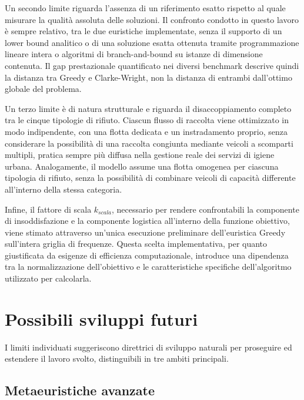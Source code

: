 Un secondo limite riguarda l'assenza di un riferimento esatto rispetto al quale misurare la qualità assoluta delle soluzioni. Il confronto condotto in questo lavoro è sempre relativo, tra le due euristiche implementate, senza il supporto di un lower bound analitico o di una soluzione esatta ottenuta tramite programmazione lineare intera o algoritmi di branch-and-bound su istanze di dimensione contenuta. Il gap prestazionale quantificato nei diversi benchmark descrive quindi la distanza tra Greedy e Clarke-Wright, non la distanza di entrambi dall'ottimo globale del problema.

Un terzo limite è di natura strutturale e riguarda il disaccoppiamento completo tra le cinque tipologie di rifiuto. Ciascun flusso di raccolta viene ottimizzato in modo indipendente, con una flotta dedicata e un instradamento proprio, senza considerare la possibilità di una raccolta congiunta mediante veicoli a scomparti multipli, pratica sempre più diffusa nella gestione reale dei servizi di igiene urbana. Analogamente, il modello assume una flotta omogenea per ciascuna tipologia di rifiuto, senza la possibilità di combinare veicoli di capacità differente all'interno della stessa categoria.

Infine, il fattore di scala $k_{scala}$, necessario per rendere confrontabili la componente di insoddisfazione e la componente logistica all'interno della funzione obiettivo, viene stimato attraverso un'unica esecuzione preliminare dell'euristica Greedy sull'intera griglia di frequenze. Questa scelta implementativa, per quanto giustificata da esigenze di efficienza computazionale, introduce una dipendenza tra la normalizzazione dell'obiettivo e le caratteristiche specifiche dell'algoritmo utilizzato per calcolarla.

\section*{Possibili sviluppi futuri}

I limiti individuati suggeriscono direttrici di sviluppo naturali per proseguire ed estendere il lavoro svolto, distinguibili in tre ambiti principali.

\subsection*{Metaeuristiche avanzate}

